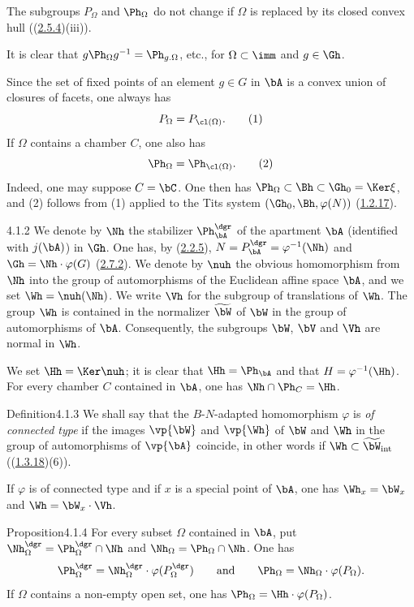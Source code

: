 \documentclass[12pt,a4paper,oneside,english]{smfart}
\makeatletter
\newcommand{\btanchor}[1]{\leavevmode\Hy@raisedlink{\hypertarget{bt:#1}{}}}
\newcommand{\btref}[1]{\hyperlink{bt:#1}{#1}}
\theoremstyle{definition}
\theoremstyle{bt}
\makeatother
\begin{document}
The subgroups $P_{\Omega}$ and $\Ph_{\Omega}$ do not change if $\Omega$ is
replaced by its closed convex hull ((\btref{2.5.4})(iii)).

It is clear that $g\Ph_{\Omega}g^{-1} = \Ph_{g.\Omega}$, etc., for
$\Omega\subset\imm$ and $g\in\Gh$.

Since the set of fixed points of an element $g\in G$ in $\bA$ is a convex
union of closures of facets, one always has
\begin{equation}
P_{\Omega} = P_{\cl(\Omega)} . \tag{1}
\end{equation}
If $\Omega$ contains a chamber $C$, one also has
\begin{equation}
\Ph_{\Omega} = \Ph_{\cl(\Omega)} . \tag{2}
\end{equation}
Indeed, one may suppose $C = \bC$. One then has
$\Ph_{\Omega}\subset\Bh\subset\Gh_0 = \Ker\xi$, and (2) follows from (1)
applied to the Tits system $(\Gh_0, \Bh, \varphi(N))$ (\btref{1.2.17}).

\num{4.1.2}\btanchor{4.1.2}
We denote by $\Nh$ the stabilizer $\Ph^{\dgr}_{\bA}$ of the apartment $\bA$
(identified with $j(\bA)$) in $\Gh$. One has, by (\btref{2.2.5}),
$N = P^{\dgr}_{\bA} = \varphi^{-1}(\Nh)$ and $\Gh = \Nh\cdot\varphi(G)$
(\btref{2.7.2}). We denote by $\nuh$ the obvious homomorphism from $\Nh$ into the
group of automorphisms of the Euclidean affine space $\bA$, and we set
$\Wh = \nuh(\Nh)$. We write $\Vh$ for the subgroup of translations of $\Wh$.
The group $\Wh$ is contained in the normalizer $\widetilde{\bW}$ of $\bW$ in
the group of automorphisms of $\bA$. Consequently, the subgroups $\bW$, $\bV$
and $\Vh$ are normal in $\Wh$.

We set $\Hh = \Ker\nuh$; it is clear that $\Hh = \Ph_{\bA}$ and that
$H = \varphi^{-1}(\Hh)$. For every chamber $C$ contained in $\bA$, one has
$\Nh\cap\Ph_{C} = \Hh$.

\begin{state}{Definition}{4.1.3}\btanchor{4.1.3}
We shall say that the $B$-$N$-adapted homomorphism $\varphi$ is
\emph{of connected type} if the images $\vp{\bW}$ and $\vp{\Wh}$ of $\bW$ and
$\Wh$ in the group of automorphisms of $\vp{\bA}$ coincide, in other words if
$\Wh \subset \widetilde{\bW}_{\mathrm{int}}$ ((\btref{1.3.18})(6)).
\end{state}

If $\varphi$ is of connected type and if $x$ is a special point of $\bA$, one
has $\Wh_x = \bW_x$ and $\Wh = \bW_x\cdot\Vh$.

\begin{state}{Proposition}{4.1.4}\btanchor{4.1.4}
For every subset $\Omega$ contained in $\bA$, put
$\Nh^{\dgr}_{\Omega} = \Ph^{\dgr}_{\Omega}\cap\Nh$ and
$\Nh_{\Omega} = \Ph_{\Omega}\cap\Nh$. One has
\[
\Ph^{\dgr}_{\Omega} = \Nh^{\dgr}_{\Omega}\cdot\varphi(P^{\dgr}_{\Omega})
\qquad\text{and}\qquad
\Ph_{\Omega} = \Nh_{\Omega}\cdot\varphi(P_{\Omega}).
\]
If $\Omega$ contains a non-empty open set, one has
$\Ph_{\Omega} = \Hh\cdot\varphi(P_{\Omega})$.
\end{state}
\end{document}
